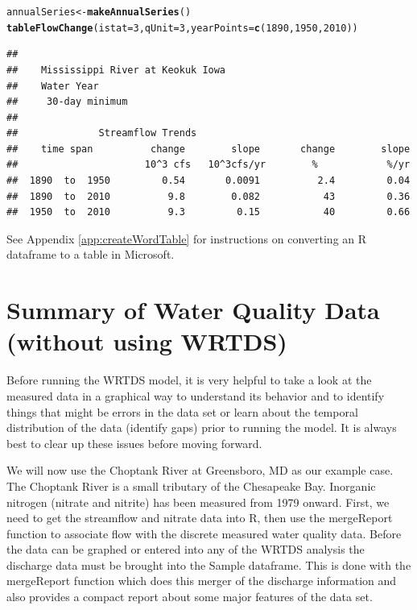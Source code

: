\documentclass[a4paper,11pt]{article}\usepackage{graphicx, color}
\makeatletter
\newcommand{\hlfunctioncall}[1]{\textcolor[rgb]{0.501960784313725,0,0.329411764705882}{\textbf{#1}}}%
\newenvironment{kframe}{%
 \def\at@end@of@kframe{}%
 \ifinner\ifhmode%
  \def\at@end@of@kframe{\end{minipage}}%
  \begin{minipage}{\columnwidth}%
 \fi\fi%
 \def\FrameCommand##1{\hskip\@totalleftmargin \hskip-\fboxsep
 \colorbox{shadecolor}{##1}\hskip-\fboxsep
     \hskip-\linewidth \hskip-\@totalleftmargin \hskip\columnwidth}%
 \MakeFramed {\advance\hsize-\width
   \@totalleftmargin\z@ \linewidth\hsize
   \@setminipage}}%
 {\par\unskip\endMakeFramed%
 \at@end@of@kframe}
\newenvironment{knitrout}{}{} %
\makeatother
\begin{document}
\begin{knitrout}
\color{fgcolor}\begin{kframe}
\begin{alltt}
annualSeries <- \hlfunctioncall{makeAnnualSeries}()
\hlfunctioncall{tableFlowChange}(istat=3, qUnit=3,yearPoints=\hlfunctioncall{c}(1890,1950,2010))
\end{alltt}
\begin{verbatim}
## 
##    Mississippi River at Keokuk Iowa
##    Water Year
##     30-day minimum 
## 
##              Streamflow Trends
##    time span          change        slope       change        slope
##                      10^3 cfs   10^3cfs/yr        %            %/yr
##  1890  to  1950         0.54       0.0091          2.4         0.04
##  1890  to  2010          9.8        0.082           43         0.36
##  1950  to  2010          9.3         0.15           40         0.66
\end{verbatim}
\end{kframe}
\end{knitrout}


See Appendix \ref{app:createWordTable} for instructions on converting an R dataframe to a table in Microsoft. 

\FloatBarrier


\section{Summary of Water Quality Data (without using WRTDS)}
\label{sec:wqa}
\FloatBarrier

Before running the WRTDS model, it is very helpful to take a look at the measured data in a graphical way to understand its behavior and to identify things that might be errors in the data set or learn about the temporal distribution of the data (identify gaps) prior to running the model.  It is always best to clear up these issues before moving forward.

We will now use the Choptank River at Greensboro, MD as our example case. The Choptank River is a small tributary of the Chesapeake Bay. Inorganic nitrogen (nitrate and nitrite) has been measured from 1979 onward. First, we need to get the streamflow and nitrate data into R, then use the mergeReport function to associate flow with the discrete measured water quality data. Before the data can be graphed or entered into any of the WRTDS analysis the discharge data must be brought into the Sample dataframe.  This is done with the mergeReport function which does this merger of the discharge information and also provides a compact report about some major features of the data set.
\end{document}
